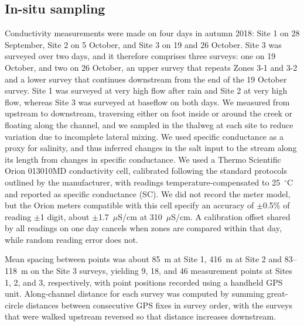 \documentclass{article}
\begin{document}
\subsection{In-situ sampling}\label{sec:sampling}

Conductivity measurements were made on four days in autumn 2018: Site 1 on 28 September, Site 2 on 5 October, and Site 3 on 19 and 26 October. Site 3 was surveyed over two days, and it therefore comprises three surveys: one on 19 October, and two on 26 October, an upper survey that repeats Zones 3-1 and 3-2 and a lower survey that continues downstream from the end of the 19 October survey. Site 1 was surveyed at very high flow after rain and Site 2 at very high flow, whereas Site 3 was surveyed at baseflow on both days. We measured from upstream to downstream, traversing either on foot inside or around the creek or floating along the channel, and we sampled in the thalweg at each site to reduce variation due to incomplete lateral mixing. We used specific conductance as a proxy for salinity, and thus inferred changes in the salt input to the stream along its length from changes in specific conductance. We used a Thermo Scientific Orion 013010MD conductivity cell, calibrated following the standard protocols outlined by the manufacturer, with readings temperature-compensated to 25~$^{\circ}$C and reported as specific conductance (SC). We did not record the meter model, but the Orion meters compatible with this cell specify an accuracy of $\pm$0.5\% of reading $\pm$1 digit, about $\pm$1.7~$\mu$S/cm at 310~$\mu$S/cm. A calibration offset shared by all readings on one day cancels when zones are compared within that day, while random reading error does not.

Mean spacing between points was about 85~m at Site 1, 416~m at Site 2 and 83--118~m on the Site 3 surveys, yielding 9, 18, and 46 measurement points at Sites 1, 2, and 3, respectively, with point positions recorded using a handheld GPS unit. Along-channel distance for each survey was computed by summing great-circle distances between consecutive GPS fixes in survey order, with the surveys that were walked upstream reversed so that distance increases downstream.
\end{document}
